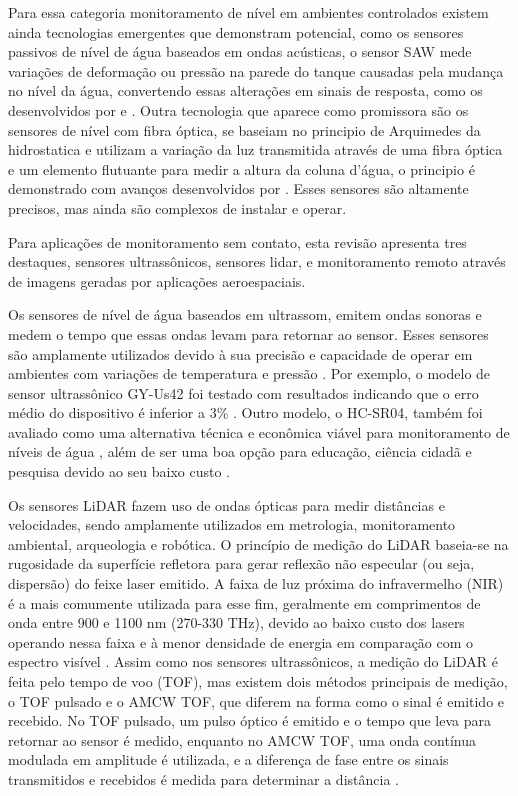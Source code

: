 \documentclass[conference]{IEEEtran}
\begin{document}
Para essa categoria  monitoramento de nível em ambientes controlados existem ainda tecnologias emergentes que demonstram potencial, como os sensores passivos de nível de água baseados em ondas acústicas, o sensor SAW mede variações de deformação ou pressão na parede do tanque causadas pela mudança no nível da água, convertendo essas alterações em sinais de resposta, como os desenvolvidos por \textcite{ali_2020_saw} e \textcite{sreejith_2024_modeling}. Outra tecnologia que aparece como promissora são os sensores de nível com fibra óptica, se baseiam no principio de Arquimedes da hidrostatica e utilizam a variação da luz transmitida através de uma fibra óptica e um elemento flutuante para medir a altura da coluna d'água, o principio é demonstrado com avanços desenvolvidos por \textcite{ramos_2025_high}. Esses sensores são altamente precisos, mas ainda são complexos de instalar e operar.

Para aplicações de monitoramento sem contato, esta revisão apresenta tres destaques, sensores ultrassônicos, sensores lidar, e monitoramento remoto através de imagens geradas por aplicações aeroespaciais.

Os sensores de nível de água baseados em ultrassom, emitem ondas sonoras e medem o tempo que essas ondas levam para retornar ao sensor. Esses sensores são amplamente utilizados devido à sua precisão e capacidade de operar em ambientes com variações de temperatura e pressão \cite{mohammadrezamasoudimoghaddam_2024_a, pereira_2022_evaluation}. Por exemplo, o modelo de sensor ultrassônico GY-Us42 foi testado com resultados indicando que o erro médio do dispositivo é inferior a 3\% \cite{mohammadrezamasoudimoghaddam_2024_a}. Outro modelo, o HC-SR04, também foi avaliado como uma alternativa técnica e econômica viável para monitoramento de níveis de água \cite{pereira_2022_evaluation}, além de ser uma boa opção para educação, ciência cidadã e pesquisa devido ao seu baixo custo \cite{bresnahan_2023_a}.

Os sensores LiDAR fazem uso de ondas ópticas para medir distâncias e velocidades, sendo amplamente utilizados em metrologia, monitoramento ambiental, arqueologia e robótica\cite{behroozpour_2017_lidar, li_2022_a}. O princípio de medição do LiDAR baseia-se na rugosidade da superfície refletora para gerar reflexão não especular (ou seja, dispersão) do feixe laser emitido. A faixa de luz próxima do infravermelho (NIR) é a mais comumente utilizada para esse fim, geralmente em comprimentos de onda entre 900 e 1100 nm (270-330 THz), devido ao baixo custo dos lasers operando nessa faixa e à menor densidade de energia em comparação com o espectro visível \cite{li_2022_a, fernandezdiaz_2014_early, smart_2009_river, behroozpour_2017_lidar}. Assim como nos sensores ultrassônicos, a medição do LiDAR é feita pelo tempo de voo (TOF), mas existem dois métodos principais de medição, o TOF pulsado e o AMCW TOF, que diferem na forma como o sinal é emitido e recebido. No TOF pulsado, um pulso óptico é emitido e o tempo que leva para retornar ao sensor é medido, enquanto no AMCW TOF, uma onda contínua modulada em amplitude é utilizada, e a diferença de fase entre os sinais transmitidos e recebidos é medida para determinar a distância \cite{li_2022_a}.
\end{document}
